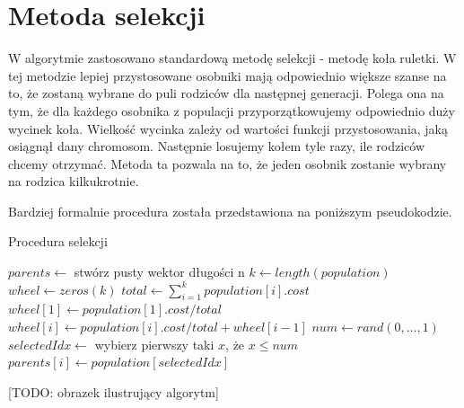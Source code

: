 \section{Metoda selekcji}
W algorytmie zastosowano standardową metodę selekcji - metodę koła ruletki. W tej metodzie lepiej przystosowane osobniki mają odpowiednio większe 
szanse na to, że zostaną wybrane do puli rodziców dla następnej generacji. Polega ona na tym, że dla każdego osobnika z populacji 
przyporzątkowujemy odpowiednio duży wycinek koła. Wielkość wycinka zależy od wartości funkcji przystosowania, jaką osiągnął dany chromosom. 
Następnie losujemy kołem tyle razy, ile rodziców chcemy otrzymać. Metoda ta pozwala na to, że jeden osobnik zostanie wybrany na rodzica kilkukrotnie.

Bardziej formalnie procedura została przedstawiona na poniższym pseudokodzie.

\begin{pseudokod}[H]
    \label{selekcja}
    \caption{Procedura selekcji}
    \BlankLine
    $parents \gets$ stwórz pusty wektor długości n\;
    $k \gets length(population)$\;
    $wheel \gets zeros(k)$
    \BlankLine
    $total \gets \sum_{i=1}^{k} population[i].cost$\;
    $wheel[1] \gets population[1].cost / total$\;
     {
        $wheel[i] \gets population[i].cost / total + wheel[i-1]$\;
    }
    \BlankLine
     {
        $num \gets rand(0,\dots, 1)$
        $selectedIdx \gets$ wybierz pierwszy taki $x$, że $x \le num$\;
        $parents[i] \gets population[selectedIdx]$\;
    }

\end{pseudokod}


[TODO: obrazek ilustrujący algorytm]

